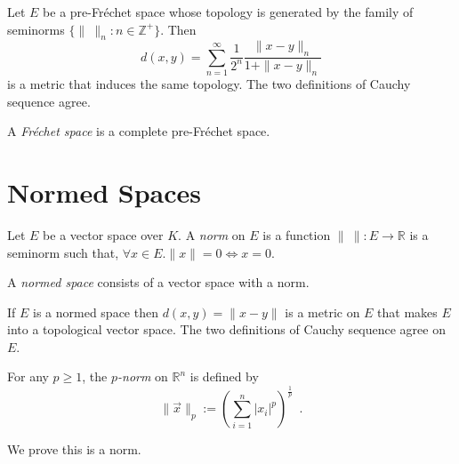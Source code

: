 \begin{prop}
Let $E$ be a pre-Fr\'{e}chet space whose topology is generated by the family of seminorms $\{ \|\ \|_n : n \in \mathbb{Z}^+ \}$. Then
\[ d(x,y) = \sum_{n=1}^\infty \frac{1}{2^n} \frac{\|x-y\|_n}{1 + \|x-y\|_n} \]
is a metric that induces the same topology. The two definitions of Cauchy sequence agree.
\end{prop}

\begin{df}
A \emph{Fr\'{e}chet space} is a complete pre-Fr\'{e}chet space.
\end{df}

\section{Normed Spaces}

\begin{df}
Let $E$ be a vector space over $K$. A \emph{norm} on $E$ is a function $\|\ \| : E \rightarrow \mathbb{R}$ is a seminorm such that, $\forall x \in E. \| x \| = 0 \Leftrightarrow x = 0$.

A \emph{normed space} consists of a vector space with a norm.
\end{df}

\begin{prop}
If $E$ is a normed space then $d(x,y) = \| x - y \|$ is a metric on $E$ that makes $E$ into a topological vector space. The two definitions of Cauchy sequence agree on $E$.
\end{prop}

\begin{df}[$p$-norm]
For any $p \geq 1$, the \emph{$p$-norm} on $\mathbb{R}^n$ is defined by
\[ \| \vec{x} \|_p := \left( \sum_{i=1}^n |x_i|^p \right)^{\frac{1}{p}} \enspace . \]

We prove this is a norm.
\end{df}


